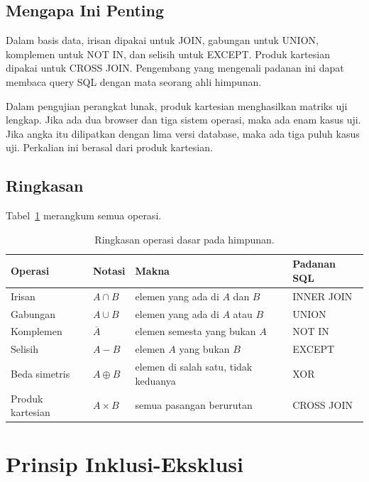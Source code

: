 \documentclass[11pt,a4paper]{article}
\begin{document}
\subsection{Mengapa Ini Penting}

Dalam basis data, irisan dipakai untuk JOIN, gabungan untuk UNION, komplemen untuk NOT IN, dan selisih untuk EXCEPT. Produk kartesian dipakai untuk CROSS JOIN. Pengembang yang mengenali padanan ini dapat membaca query SQL dengan mata seorang ahli himpunan.

Dalam pengujian perangkat lunak, produk kartesian menghasilkan matriks uji lengkap. Jika ada dua browser dan tiga sistem operasi, maka ada enam kasus uji. Jika angka itu dilipatkan dengan lima versi database, maka ada tiga puluh kasus uji. Perkalian ini berasal dari produk kartesian.

\subsection{Ringkasan}

Tabel~\ref{tab:operasi-himpunan} merangkum semua operasi.

\begin{table}[H]
	\centering
	\caption{Ringkasan operasi dasar pada himpunan.}
	\label{tab:operasi-himpunan}
	\small
	\begin{tabularx}{\textwidth}{l l X X}
		\toprule
		Operasi          & Notasi         & Makna                                & Padanan SQL \\
		\midrule
		Irisan           & $A \cap B$     & elemen yang ada di $A$ dan $B$       & INNER JOIN  \\
		Gabungan         & $A \cup B$     & elemen yang ada di $A$ atau $B$      & UNION       \\
		Komplemen        & $\overline{A}$ & elemen semesta yang bukan $A$        & NOT IN      \\
		Selisih          & $A-B$          & elemen $A$ yang bukan $B$            & EXCEPT      \\
		Beda simetris    & $A \oplus B$   & elemen di salah satu, tidak keduanya & XOR         \\
		Produk kartesian & $A \times B$   & semua pasangan berurutan             & CROSS JOIN  \\
		\bottomrule
	\end{tabularx}
\end{table}

\section{Prinsip Inklusi-Eksklusi}
\end{document}
